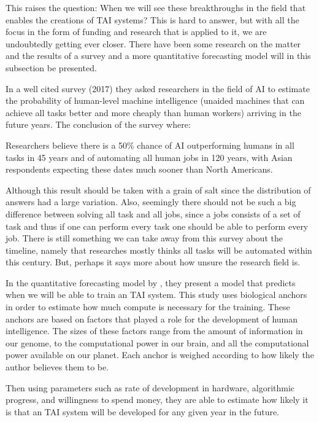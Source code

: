 \documentclass[12pt,A4]{report}
\theoremstyle{definition}
\begin{document}
This raises the question: When we will see these breakthroughs in the field that enables the creations of TAI systems? This is hard to answer, but with all the focus in the form of funding\autocite{K'lla} and research\autocite{k'lla} that is applied to it, we are undoubtedly getting ever closer. There have been some research on the matter and the results of a survey and a more quantitative forecasting model will in this subsection be presented. 

In a well cited survey \autocite{Grace et al} (2017) they asked researchers in the field of AI to estimate the probability of human-level machine intelligence (unaided machines that can achieve all tasks better and more cheaply than human workers) arriving in the future years. The conclusion of the survey where:
\begin{displayquote}
Researchers believe there is a 50\% chance of AI outperforming humans in all tasks in 45 years and of automating all human jobs in 120 years, with Asian respondents expecting these dates much sooner than North Americans.
\end{displayquote}
Although this result should be taken with a grain of salt since the distribution of answers had a large variation. Also, seemingly there should not be such a big difference between solving all task and all jobs, since a jobs consists of a set of task and thus if one can perform every task one should be able to perform every job. There is still something we can take away from this survey about the timeline, namely that researches mostly thinks all tasks will be automated within this century. But, perhaps it says more about how unsure the research field is. 

In the quantitative forecasting model by \autocite{Ajeya Cotra}, they present a model that predicts when we will be able to train an TAI system. This study uses biological anchors in order to estimate how much compute is necessary for the training. These anchors are based on factors that played a role for the development of human intelligence. The sizes of these factors range from the amount of information in our genome, to the computational power in our brain, and all the computational power available on our planet. Each anchor is weighed according to how likely the author believes them to be. 

Then using parameters such as rate of development in hardware, algorithmic progress, and willingness to spend money, they are able to estimate how likely it is that an TAI system will be developed for any given year in the future. 
\end{document}
